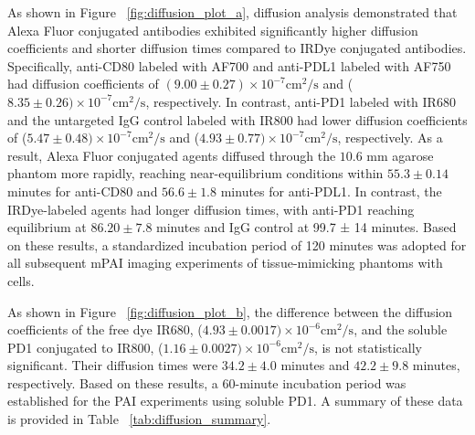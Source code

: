 As shown in Figure ~\ref{fig:diffusion_plot_a}, diffusion analysis demonstrated that Alexa Fluor conjugated antibodies exhibited significantly higher diffusion coefficients and shorter diffusion times compared to IRDye conjugated antibodies. Specifically, anti-CD80 labeled with AF700 and
anti-PDL1 labeled with AF750 had diffusion coefficients of $(9.00 \pm 0.27) \times 10^{-7} \mathrm{cm}^2/\mathrm{s}$ and ($8.35 \pm 0.26) \times 10^{-7} \mathrm{cm}^2/\mathrm{s}$, respectively. In contrast, anti-PD1 labeled with IR680 and the untargeted IgG control labeled with IR800 had lower diffusion coefficients of ($5.47 \pm 0.48) \times 10^{-7} \mathrm{cm}^2/\mathrm{s}$ and
($4.93 \pm 0.77) \times 10^{-7} \mathrm{cm}^2/\mathrm{s}$, respectively. As a result, Alexa Fluor conjugated agents diffused through the $10.6$ mm agarose phantom more rapidly, reaching near-equilibrium conditions within $55.3 \pm 0.14$ minutes for anti-CD80 and $56.6 \pm 1.8$ minutes for anti-PDL1. In contrast, the IRDye-labeled agents had longer diffusion times, with anti-PD1 reaching equilibrium at $86.20 \pm 7.8$ minutes and IgG control at 99.7 ± 14 minutes. Based on these results, a standardized incubation period of 120 minutes was adopted for all subsequent mPAI imaging experiments of tissue-mimicking phantoms with cells.

As shown in Figure ~\ref{fig:diffusion_plot_b}, the difference between the diffusion coefficients of the free dye IR680, ($4.93  \pm 0.0017)\times 10^{-6} \mathrm{cm}^2/\mathrm{s}$, and the soluble PD1 conjugated to IR800, ($1.16 \pm 0.0027) \times 10^{-6} \mathrm{cm}^2/\mathrm{s}$, is not statistically significant. Their diffusion times were $34.2 \pm 4.0$ minutes and $42.2 \pm 9.8$ minutes, respectively. Based on these results, a 60-minute incubation period was established for the PAI experiments using soluble PD1. A summary of these data is provided in Table ~\ref{tab:diffusion_summary}.

